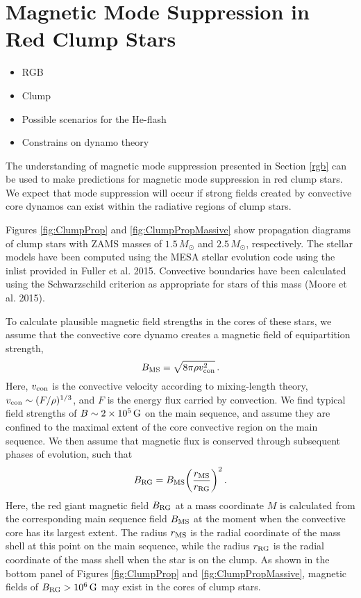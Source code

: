 \section{Magnetic Mode Suppression in Red Clump Stars}
\begin{itemize}
\item RGB 
\item Clump
\item Possible scenarios for the He-flash
\item Constrains on dynamo theory
\end{itemize}

The understanding of magnetic mode suppression presented in Section \ref{rgb} can be used to make predictions for magnetic mode suppression in red clump stars. We expect that mode suppression will occur if strong fields created by convective core dynamos can exist within the radiative regions of clump stars. 

Figures \ref{fig:ClumpProp} and \ref{fig:ClumpPropMassive} show propagation diagrams of clump stars with ZAMS masses of $1.5 \, M_\odot$ and $2.5 \, M_\odot$, respectively. The stellar models have been computed using the MESA stellar evolution code \citep{Paxton_2010} using the inlist provided in Fuller et al. 2015. Convective boundaries have been calculated using the Schwarzschild criterion as appropriate for stars of this mass (Moore et al. 2015).

To calculate plausible magnetic field strengths in the cores of these stars, we assume that the convective core dynamo creates a magnetic field of equipartition strength,
\begin{equation}
\label{eqn:Beq}
B_{\rm MS} = \sqrt{ 8 \pi \rho v_{\rm con}^2} \, .
\end{equation}
Here, $v_{\rm con}$ is the convective velocity according to mixing-length theory, $v_{\rm con} \sim (F/\rho)^{1/3}$, and $F$ is the energy flux carried by convection. We find typical field strengths of $B \sim 2 \times 10^5 \, {\rm G}$ on the main sequence, and assume they are confined to the maximal extent of the core convective region on the main sequence. We then assume that magnetic flux is conserved through subsequent phases of evolution, such that
\begin{equation}
\label{eqn:Brgb}
B_{\rm RG} = B_{\rm MS} \bigg( \frac{r_{\rm MS}}{r_{\rm RG}} \bigg)^2 \, .
\end{equation}
Here, the red giant magnetic field $B_{\rm RG}$ at a mass coordinate $M$ is calculated from the corresponding main sequence field $B_{\rm MS}$ at the moment when the convective core has its largest extent. The radius $r_{\rm MS}$ is the radial coordinate of the mass shell at this point on the main sequence, while the radius $r_{\rm RG}$ is the radial coordinate of the mass shell when the star is on the clump. As shown in the bottom panel of Figures \ref{fig:ClumpProp} and \ref{fig:ClumpPropMassive}, magnetic fields of $B_{\rm RG} > 10^6 \, {\rm G}$ may exist in the cores of clump stars. 

